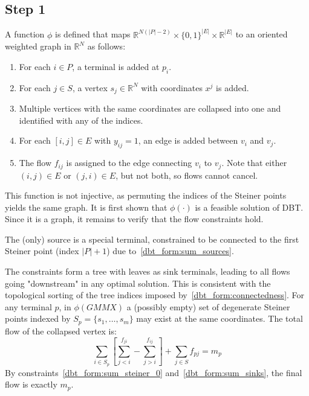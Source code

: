 \documentclass[12pt,a4paper]{article}
\numberwithin{equation}{section}
\theoremstyle{mytheorem}
\theoremstyle{myremark}
\theoremstyle{myparagraph}
\newcommand{\R}{\mathbb{R}}
\begin{document}
    \subsection*{Step 1}
    A function $\phi$ is defined that maps $\mathbb{R}^{N (|P|-2)} \times \{0,1\}^{|E|} \times \R^{|E|}$ to an oriented weighted graph in $\mathbb{R}^N$ as follows:

    \begin{enumerate}
        \item For each $i \in P$, a terminal is added at $p_i$.
        \item For each $j \in S$, a vertex $s_j \in \R^N$ with coordinates $x^j$ is added.
        \item Multiple vertices with the same coordinates are collapsed into one and identified with any of the indices.
        \item For each $[i,j] \in E$ with $y_{ij} = 1$, an edge is added between $v_i$ and $v_j$.
        \item The flow $f_{ij}$ is assigned to the edge connecting $v_i$ to $v_j$. Note that either $(i,j) \in E$ or $(j,i) \in E$, but not both, so flows cannot cancel.
    \end{enumerate}

    This function is not injective, as permuting the indices of the Steiner points yields the same graph.
    It is first shown that $\phi(\cdot)$ is a feasible solution of DBT. Since it is a graph, it remains to verify that the flow constraints hold.

    The (only) source is a special terminal, constrained to be connected to the first Steiner point (index $|P|+1$) due to~\ref{dbt_form:sum_sources}.

    The constraints form a tree with leaves as sink terminals, leading to all flows going "downstream" in any optimal solution. 
    This is consistent with the topological sorting of the tree indices imposed by~\ref{dbt_form:connectedness}.
    For any terminal $p$, in $\phi(GMMX)$ a (possibly empty) set of degenerate Steiner points indexed by $S_p = \{s_1, \dots, s_m\}$ 
    may exist at the same coordinates.
    The total flow of the collapsed vertex is:
    \begin{equation}
        \sum_{i \in S_p} \left[ \sum_{j<i}^{f_{ji}} - \sum_{j>i}^{f_{ij}}   \right] + \sum_{j \in S} f_{pj} = m_p
    \end{equation}
    By constraints~\ref{dbt_form:sum_steiner_0} and~\ref{dbt_form:sum_sinks}, the final flow is exactly $m_p$.
\end{document}
